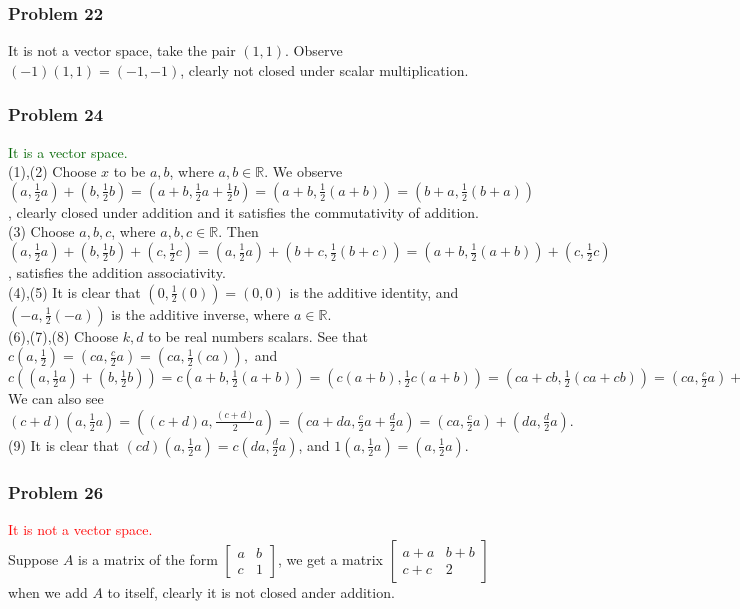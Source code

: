 \documentclass[a4paper,12pt]{article}
\begin{document}
\subsubsection*{Problem 22}
It is not a vector space, take the pair $(1,1)$. Observe $(-1)(1,1)=(-1,-1)$, clearly not closed under scalar multiplication.
\subsubsection*{Problem 24}
\textcolor{darkgreen}{It is a vector space.}\\
(1),(2) Choose $x$ to be $a,b$, where $a,b \in \mathbb{R}$. We observe $(a, \frac{1}{2}a)+(b,\frac{1}{2}b)=(a+b, \frac{1}{2}a+\frac{1}{2}b)=(a+b, \frac{1}{2}(a+b))=(b+a, \frac{1}{2}(b+a))$, clearly closed under addition and it satisfies the commutativity of addition.\\
(3) Choose $a,b,c$, where $a,b,c \in \mathbb{R}.$ Then $(a,\frac{1}{2}a)+(b,\frac{1}{2}b)+(c,\frac{1}{2}c)=(a,\frac{1}{2}a)+(b+c,\frac{1}{2}(b+c))=(a+b,\frac{1}{2}(a+b))+(c,\frac{1}{2}c)$, satisfies the addition associativity.\\
(4),(5) It is clear that $(0,\frac{1}{2} (0))=(0,0)$ is the additive identity, and $(-a,\frac{1}{2}(-a))$ is the additive inverse, where $a\in \mathbb{R}$. \\
(6),(7),(8) Choose $k,d$ to be real numbers scalars. See that $c(a,\frac{1}{2})=(ca,\frac{c}{2}a)=(ca,\frac{1}{2}(ca)),$ and $c((a,\frac{1}{2}a)+(b,\frac{1}{2}b))=c(a+b,\frac{1}{2}(a+b))=(c(a+b),\frac{1}{2}c(a+b))=(ca+cb,\frac{1}{2}(ca+cb))=(ca,\frac{c}{2}a)+(cb,\frac{c}{2}b).$
We can also see $(c+d)(a,\frac{1}{2}a)=((c+d)a,\frac{(c+d)}{2}a)=(ca+da,\frac{c}{2}a+\frac{d}{2}a)=(ca,\frac{c}{2}a)+(da,\frac{d}{2}a).$\\
(9) It is clear that $(cd)(a,\frac{1}{2}a)=c(da,\frac{d}{2}a)$, and $1(a,\frac{1}{2}a)=(a,\frac{1}{2}a).$
\subsubsection*{Problem 26}
\textcolor{red}{It is not a vector space.}\\ Suppose $A$ is a matrix of the form $\begin{bmatrix}
   a& b \\
   c& 1
\end{bmatrix}$, we get a matrix $\begin{bmatrix}
  a+a & b+b \\
   c+c & 2
\end{bmatrix}$ when we add $A$ to itself, clearly it is not closed ander addition.
\end{document}

